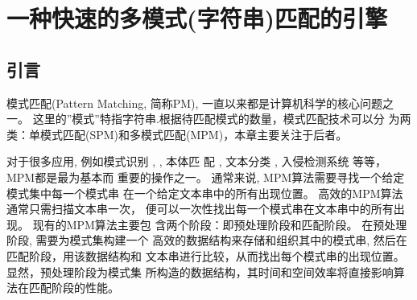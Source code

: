 





\chapter{一种快速的多模式(字符串)匹配的引擎}

\section{引言}
\label{sec:introduction}


模式匹配(Pattern Matching, 简称PM), 一直以来都是计算机科学的核心问题之
一。 这里的''模式''特指字符串.根据待匹配模式的数量，模式匹配技术可以分
为两类：单模式匹配(SPM)和多模式匹配(MPM)，本章主要关注于后者。

对于很多应用, 例如模式识别 \cite{Yan2016}, \cite{Xiao2016}, 本体匹
配 \cite{Xue2015} \cite{Xue2016}, 文本分类 \cite{Tang2015}
\cite{Zhang2016}, 入侵检测系统 \cite{Kim2015} 等等， MPM都是最为基本而
重要的操作之一。 通常来说, MPM算法需要寻找一个给定模式集中每一个模式串
在一个给定文本串中的所有出现位置。 高效的MPM算法通常只需扫描文本串一次，
便可以一次性找出每一个模式串在文本串中的所有出现。 现有的MPM算法主要包
含两个阶段：即预处理阶段和匹配阶段。 在预处理阶段, 需要为模式集构建一个
高效的数据结构来存储和组织其中的模式串, 然后在匹配阶段，用该数据结构和
文本串进行比较，从而找出每个模式串的出现位置。 显然，预处理阶段为模式集
所构造的数据结构，其时间和空间效率将直接影响算法在匹配阶段的性能。

